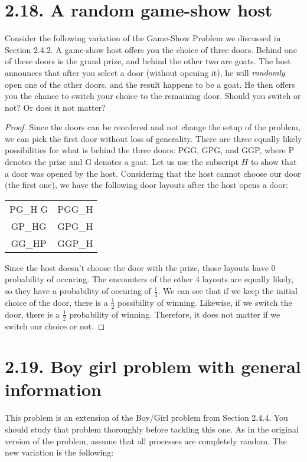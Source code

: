 \section*{2.18. A random game-show host}
Consider the following variation of the Game-Show Problem we discussed in Section 2.4.2. A game-show
host offers you the choice of three doors. Behind one of these doors is the grand prize, and behind
the other two are goats. The host announces that after you select a door (without opening it), he will
$\emph{randomly}$ open one of the other doors, and the result happens to be a goat. He then offers
you the chance to switch your choice to the remaining door. Should you switch or not? Or does it 
not matter?

\vspace{1em}

\begin{proof}
    Since the doors can be reordered and not change the setup of the problem, we can pick the first
    door without loss of generality. There are three equally likely possibilities
    for what is behind the three doors: PGG, GPG, and GGP, where P denotes the prize and G denotes
    a goat. Let us use the subscript $H$ to show that a door was opened by the host. Considering that
    the host cannot choose our door (the first one), we have the following door layouts after the host 
    opens a door:

    \pagebreak

    \begin{table}[h]
        \centering
        \begin{tabular}{cc}
            PG_H G & PGG_H \\ 
            GP_HG & GPG_H \\
            GG_HP & GGP_H
        \end{tabular}
    \end{table}

    Since the host doesn't choose the door with the prize, those layouts have 0 probability of 
    occuring. The encounters of the other 4 layouts are equally likely, so they have a probability 
    of occuring of $\frac{1}{4}$. We can see that if we keep the initial choice of the door,
    there is a $\frac{1}{2}$ possibility of winning. Likewise, if we switch the door, there 
    is a $\frac{1}{2}$ probability of winning. Therefore, it does not matter if we switch our choice or not.
\end{proof}

\section*{2.19. Boy girl problem with general information}
This problem is an extension of the Boy/Girl problem from Section 2.4.4. You should study that 
problem thoroughly before tackling this one. As in the original version of the problem, assume
that all processes are completely random. The new variation is the following:

